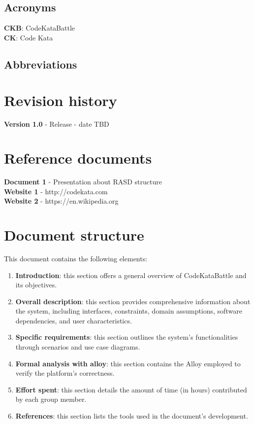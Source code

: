 \documentclass[12pt, a4paper]{report}
\begin{document}
    \subsection{Acronyms}
    \textbf{CKB}: CodeKataBattle 
    \\
    \textbf{CK}: Code Kata
    \subsection{Abbreviations}
    

    \section{Revision history}
    \textbf{Version 1.0} - Release - date TBD


    \section{Reference documents}
    \textbf{Document 1} - Presentation about RASD structure
    \\
    \textbf{Website 1} - http://codekata.com
    \\
    \textbf{Website 2} - https://en.wikipedia.org


    \section{Document structure}
    This document contains the following elements: 
    \begin{enumerate}
        \item \textbf{Introduction}: this section offers a general overview of CodeKataBattle and its objectives.
        \item \textbf{Overall description}: this section provides comprehensive information about the system, including interfaces, constraints, domain assumptions, software dependencies, and user characteristics.
        \item \textbf{Specific requirements}: this section outlines the system's functionalities through scenarios and use case diagrams.
        \item \textbf{Formal analysis with alloy}: this section contains the Alloy employed to verify the platform's correctness.
        \item \textbf{Effort spent}: this section details the amount of time (in hours) contributed by each group member.
        \item \textbf{References}: this section lists the tools used in the document's development.
    \end{enumerate}
\end{document}
